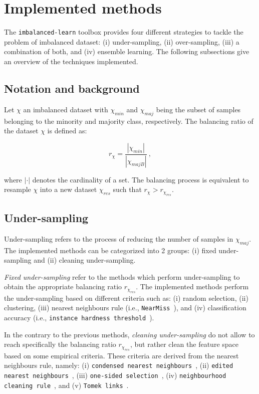 \documentclass[twoside,11pt]{article}
\begin{document}
\section{Implemented methods}

The \texttt{imbalanced-learn} toolbox provides four different strategies to tackle the problem of imbalanced dataset:
(i) under-sampling, (ii) over-sampling, (iii) a combination of both, and (iv) ensemble learning.
The following subsections give an overview of the techniques implemented.

\subsection{Notation and background}

Let $\chi$ an imbalanced dataset with $\chi_{min}$ and $\chi_{maj}$ being the subset of samples belonging to the minority and majority class, respectively.
The balancing ratio of the dataset $\chi$ is defined as:

\begin{equation}
r_{\chi} = \frac{|\chi_{min}|}{|\chi_{majB}|} \ ,
\end{equation}

\noindent where $|\cdot|$ denotes the cardinality of a set. The balancing process is equivalent to resample $\chi$ into a new dataset $\chi_{res}$ such that $r_{\chi} > r_{\chi_{res}}$.

\subsection{Under-sampling}

Under-sampling refers to the process of reducing the number of samples in $\chi_{maj}$.
The implemented methods can be categorized into 2 groups: (i) fixed under-sampling and (ii) cleaning under-sampling.

\emph{Fixed under-sampling} refer to the methods which perform under-sampling to obtain the appropriate balancing ratio $r_{\chi_{res}}$.
The implemented methods perform the under-sampling based on different criteria such as: (i) random selection, (ii) clustering, (iii) nearest neighbours rule (i.e., \texttt{NearMiss}~\citep{mani2003knn}), and (iv) classification accuracy (i.e., \texttt{instance hardness threshold}~\citep{smith2014instance}).

In the contrary to the previous methods, \emph{cleaning under-sampling} do not allow to reach specifically the balancing ratio $r_{\chi_{res}}$, but rather clean the feature space based on some empirical criteria.
These criteria are derived from the nearest neighbours rule, namely: (i) \texttt{condensed nearest neighbours}~\citep{hart1968condensed}, (ii) \texttt{edited nearest neighbours}~\citep{wilson1972asymptotic}, (iii) \texttt{one-sided selection}~\citep{kubat1997addressing}, (iv) \texttt{neighbourhood cleaning rule}~\citep{laurikkala2001improving}, and (v) \texttt{Tomek links}~\citep{tomek1976two}.
\end{document}
